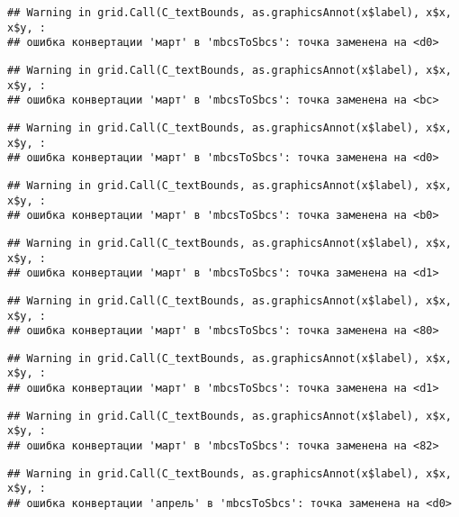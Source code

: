 \documentclass[
]{article}
\begin{document}
\begin{verbatim}
## Warning in grid.Call(C_textBounds, as.graphicsAnnot(x$label), x$x, x$y, :
## ошибка конвертации 'март' в 'mbcsToSbcs': точка заменена на <d0>
\end{verbatim}

\begin{verbatim}
## Warning in grid.Call(C_textBounds, as.graphicsAnnot(x$label), x$x, x$y, :
## ошибка конвертации 'март' в 'mbcsToSbcs': точка заменена на <bc>
\end{verbatim}

\begin{verbatim}
## Warning in grid.Call(C_textBounds, as.graphicsAnnot(x$label), x$x, x$y, :
## ошибка конвертации 'март' в 'mbcsToSbcs': точка заменена на <d0>
\end{verbatim}

\begin{verbatim}
## Warning in grid.Call(C_textBounds, as.graphicsAnnot(x$label), x$x, x$y, :
## ошибка конвертации 'март' в 'mbcsToSbcs': точка заменена на <b0>
\end{verbatim}

\begin{verbatim}
## Warning in grid.Call(C_textBounds, as.graphicsAnnot(x$label), x$x, x$y, :
## ошибка конвертации 'март' в 'mbcsToSbcs': точка заменена на <d1>
\end{verbatim}

\begin{verbatim}
## Warning in grid.Call(C_textBounds, as.graphicsAnnot(x$label), x$x, x$y, :
## ошибка конвертации 'март' в 'mbcsToSbcs': точка заменена на <80>
\end{verbatim}

\begin{verbatim}
## Warning in grid.Call(C_textBounds, as.graphicsAnnot(x$label), x$x, x$y, :
## ошибка конвертации 'март' в 'mbcsToSbcs': точка заменена на <d1>
\end{verbatim}

\begin{verbatim}
## Warning in grid.Call(C_textBounds, as.graphicsAnnot(x$label), x$x, x$y, :
## ошибка конвертации 'март' в 'mbcsToSbcs': точка заменена на <82>
\end{verbatim}

\begin{verbatim}
## Warning in grid.Call(C_textBounds, as.graphicsAnnot(x$label), x$x, x$y, :
## ошибка конвертации 'апрель' в 'mbcsToSbcs': точка заменена на <d0>
\end{verbatim}
\end{document}
